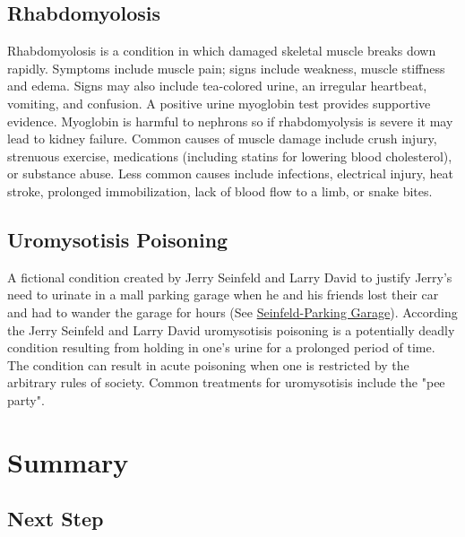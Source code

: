 \subsection{Rhabdomyolosis}
Rhabdomyolosis is a condition in which damaged skeletal muscle breaks down rapidly. Symptoms include muscle pain; signs include weakness, muscle stiffness and edema. Signs may also include tea-colored urine, an irregular heartbeat, vomiting, and confusion. A positive urine myoglobin test provides supportive evidence. Myoglobin is harmful to nephrons so if rhabdomyolysis is severe it may lead to kidney failure. Common causes of muscle damage include crush injury, strenuous exercise, medications (including statins for lowering blood cholesterol), or substance abuse. Less common causes include infections, electrical injury, heat stroke, prolonged immobilization, lack of blood flow to a limb, or snake bites.

\subsection{Uromysotisis Poisoning}

A fictional condition created by Jerry Seinfeld and Larry David to justify Jerry's need to urinate in a mall parking garage when he and his friends lost their car and had to wander the garage for hours (See \href{https://www.youtube.com/watch?v=OG6b7KJ1Ah0}{Seinfeld-Parking Garage}). According the Jerry Seinfeld and Larry David uromysotisis poisoning is a potentially deadly condition resulting from holding in one's urine for a prolonged period of time. The condition can result in acute poisoning when one is restricted by the arbitrary rules of society. Common treatments for uromysotisis include the "pee party".

\section{Summary}

\subsection{Next Step}

\printbibliography[heading=subbibintoc]
